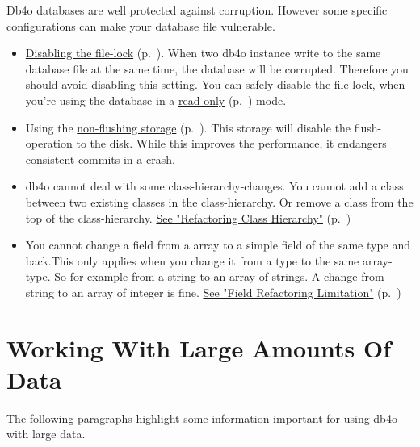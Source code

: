 Db4o databases are well protected against corruption. However some specific configurations can make your database file vulnerable.

\begin{itemize}
\item \hyperref[ref:configuration-file-lock-database]{Disabling the file-lock} (p.~\pageref{ref:configuration-file-lock-database}). When two db4o instance write to the same database file at the same time, the database will be corrupted. Therefore you should avoid disabling this setting. You can safely disable the file-lock, when you're using the database in a \hyperref[ref:configuration-file-read-only]{read-only} (p.~\pageref{ref:configuration-file-read-only}) mode.
\item Using the \hyperref[ref:configuration-file-storage-nonflushingstorage]{non-flushing storage} (p.~\pageref{ref:configuration-file-storage-nonflushingstorage}). This storage will disable the flush-operation to the disk. While this improves the performance, it endangers consistent commits in a crash.
\item db4o cannot deal with some class-hierarchy-changes. You cannot add a class between two existing classes in the class-hierarchy. Or remove a class from the top of the class-hierarchy. \hyperref[ref:advanced-topics-refactoring-and-schema-evolution-refactoring-class-hierarchy]{See "Refactoring Class Hierarchy"} (p.~\pageref{ref:advanced-topics-refactoring-and-schema-evolution-refactoring-class-hierarchy})
\item You cannot change a field from a array to a simple field of the same type and back.This only applies when you change it from a type to the same array-type. So for example from a string to an array of strings. A change from string to an array of integer is fine. \hyperref[ref:advanced-topics-refactoring-and-schema-evolution-field-refactoring-limitation]{See "Field Refactoring Limitation"} (p.~\pageref{ref:advanced-topics-refactoring-and-schema-evolution-field-refactoring-limitation})
\end{itemize}

\section{Working With Large Amounts Of Data}
\label{ref:usage-pitfalls-working-with-large-amounts-of-data}

The following paragraphs highlight some information important for using db4o with large data.

